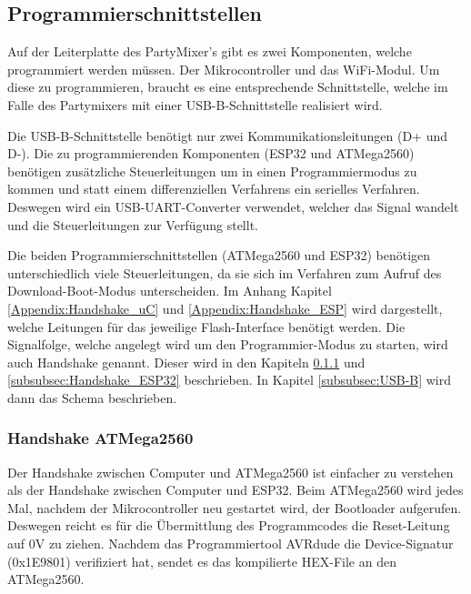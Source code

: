 \clearpage
\subsection{Programmierschnittstellen}
\label{subsec:Programmierschnittstellen}

Auf der Leiterplatte des PartyMixer's gibt es zwei Komponenten, welche programmiert werden müssen. Der Mikrocontroller und das WiFi-Modul. Um diese zu programmieren, braucht es eine entsprechende Schnittstelle, welche im Falle des Partymixers mit einer USB-B-Schnittstelle realisiert wird.

Die USB-B-Schnittstelle benötigt nur zwei Kommunikationsleitungen (D+ und D-). Die zu programmierenden Komponenten (ESP32 und ATMega2560) benötigen zusätzliche Steuerleitungen um in einen Programmiermodus zu kommen und statt einem differenziellen Verfahrens ein serielles Verfahren. Deswegen wird ein USB-UART-Converter verwendet, welcher das Signal wandelt und die Steuerleitungen zur Verfügung stellt.

Die beiden Programmierschnittstellen (ATMega2560 und ESP32) benötigen unterschiedlich viele Steuerleitungen, da sie sich im Verfahren zum Aufruf des Download-Boot-Modus unterscheiden. Im Anhang Kapitel \ref{Appendix:Handshake_uC} und \ref{Appendix:Handshake_ESP} wird dargestellt, welche Leitungen für das jeweilige Flash-Interface benötigt werden. Die Signalfolge, welche angelegt wird um den Programmier-Modus zu starten, wird auch Handshake genannt. Dieser wird in den Kapiteln \ref{subsubsec:Handshake_ATMega2560} und \ref{subsubsec:Handshake_ESP32} beschrieben. In Kapitel \ref{subsubsec:USB-B} wird dann das Schema beschrieben.

\subsubsection{Handshake ATMega2560}\label{subsubsec:Handshake_ATMega2560}

Der Handshake zwischen Computer und ATMega2560 ist einfacher zu verstehen als der Handshake zwischen Computer und ESP32. Beim ATMega2560 wird jedes Mal, nachdem der Mikrocontroller neu gestartet wird, der Bootloader aufgerufen. Deswegen reicht es für die Übermittlung des Programmcodes die Reset-Leitung auf 0V zu ziehen. Nachdem das Programmiertool AVRdude die Device-Signatur (0x1E9801) verifiziert hat, sendet es das kompilierte HEX-File an den ATMega2560.


